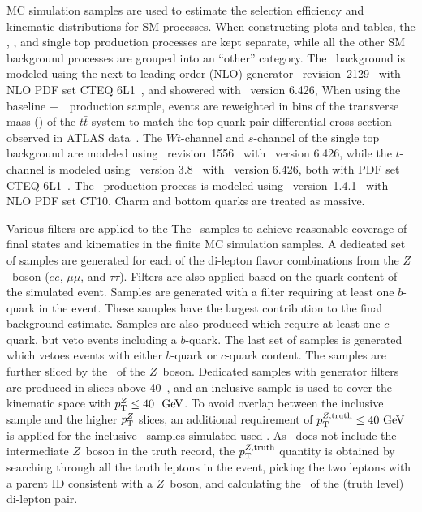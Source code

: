 MC simulation samples are used to estimate the selection efficiency
and kinematic distributions for SM processes.
When constructing plots and tables, the \TTBAR, \ZGAMMAJETS, and single top
production processes are kept separate, while all the other SM background
processes are grouped into an ``other'' category.
The \TTBAR\ background is modeled using the next-to-leading order (NLO)
generator \POWHEG\ 
revision~2129~\cite{Nason:2004rx, Frixione:2007vw, Alioli:2010xd,
Frixione:2007nw} with NLO PDF set CTEQ 6L1~\cite{Nadolsky:2008zw}, and 
showered with \PYTHIA\ version 6.426,
When using the baseline \POWHEG+\PYTHIA\ \TTBAR\ production sample,
events are reweighted in bins of the transverse mass (\pt) of the
$t\bar{t}$ system to match the top quark pair differential cross section
observed in ATLAS data~\cite{Aad:2012hg,Aad:2014zka}.
The $Wt$-channel and $s$-channel of the single top background are modeled using
\POWHEG\ revision~1556~\cite{Alioli:2009je}
with \PYTHIA\ version 6.426, while the $t$-channel is modeled using
\acermc\ version 3.8~\cite{Kersevan:2004yg} with \PYTHIA\ version 6.426,
both with PDF set CTEQ 6L1~\cite{Nadolsky:2008zw}.
The \ZGAMMAJETS\ production process is modeled using
\SHERPA\ version~1.4.1~\cite{Gleisberg:2008ta} with NLO PDF set CT10.
Charm and bottom quarks are treated as massive.

Various filters are applied to the The \ZGAMMAJETS\ samples to achieve
reasonable coverage of final states and kinematics in the finite MC simulation
samples.
A dedicated set of samples are generated for each of the di-lepton flavor
combinations from the $Z$~boson ($ee$, $\mu\mu$, and $\tau\tau$).
Filters are also applied based on the quark content of the simulated event.
Samples are generated with a filter requiring at least one $b$-quark in the
event.
These samples have the largest contribution to the final background estimate.
Samples are also produced which require at least one $c$-quark, but veto events
including a $b$-quark.
The last set of samples is generated which vetoes events with either $b$-quark
or $c$-quark content.
The samples are further sliced by the \pt\ of the $Z$~boson.
Dedicated samples with generator filters are produced in slices above 40~\GeV,
and an inclusive sample is used to cover the kinematic space with
$\pt^{Z} \leq 40~\GeV$.
To avoid overlap between the inclusive sample and the higher $p_{\mathrm{T}}^{Z}$ slices,
an additional requirement of $\pt^{Z,\mathrm{truth}} \leq 40 \GeV$ is applied
for the inclusive \ZGAMMAJETS\ samples simulated used \sherpa.
As \sherpa\ does not include the intermediate $Z$~boson in the truth record,
the $p_{\mathrm{T}}^{Z,\mathrm{truth}}$ quantity is obtained by searching through all the
truth leptons in the event, picking the two leptons with a parent ID
consistent with a $Z$~boson, and calculating the \pt\ of the (truth level) 
di-lepton pair.

